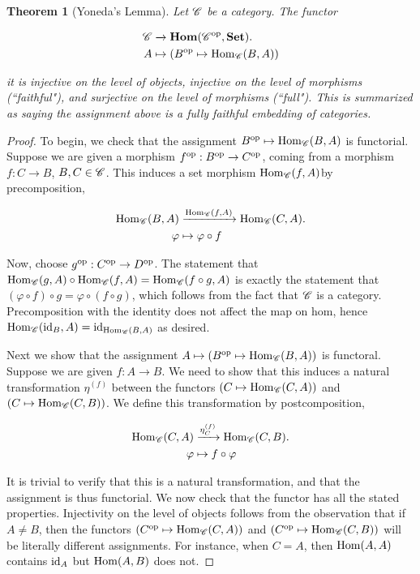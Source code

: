 \documentclass{article}
\newtheorem{theorem}{Theorem}[section]
\theoremstyle{definition}
\numberwithin{figure}{section}
\begin{document}
\begin{theorem}[Yoneda's Lemma] Let $\mathscr{C}$ be a category. The functor

\begin{align*}
\mathscr{C} &\xrightarrow{} \bold{Hom}(\mathscr{C}^{\mathrm{op}},\bold{Set}).\\
A & \mapsto (B^{\mathrm{op}} \mapsto \mathrm{Hom}_{\mathscr{C}}(B,A))
\end{align*}

it is injective on the level of objects, injective on the level of morphisms (``faithful"), and surjective on the level of morphisms (``full"). This is summarized as saying the assignment above is a fully faithful embedding of categories.
\end{theorem}
\begin{proof} To begin, we check that the assignment $B^{\mathrm{op}}\mapsto \mathrm{Hom}_{\mathscr{C}}(B,A)$ is functorial. Suppose we are given a morphism $f^{\mathrm{op}}:B^{\mathrm{op}}\to C^{\mathrm{op}}$, coming from a morphism $f:C\to B$, $B,C\in \mathscr{C}$. This induces a set morphism $\mathrm{Hom}_{\mathscr{C}}(f,A)$by precomposition,

\begin{align*}
\mathrm{Hom}_{\mathscr{C}}(B,A)&\xrightarrow{\mathrm{Hom}_{\mathscr{C}}(f,A)} \mathrm{Hom}_{\mathscr{C}}(C,A).\\
\varphi &\mapsto \varphi \circ f
\end{align*}

Now, choose $g^{\mathrm{op}}:C^{\mathrm{op}}\to D^{\mathrm{op}}$. The statement that $\mathrm{Hom}_{\mathscr{C}}(g,A)\circ \mathrm{Hom}_{\mathscr{C}}(f,A)=\mathrm{Hom}_{\mathscr{C}}(f\circ g, A)$ is exactly the statement that $(\varphi \circ f)\circ g =\varphi \circ (f\circ g)$, which follows from the fact that $\mathscr{C}$ is a category. Precomposition with the identity does not affect the map on hom, hence $\mathrm{Hom}_{\mathscr{C}}(\mathrm{id}_{B},A)=\mathrm{id}_{\mathrm{Hom}_{\mathscr{C}}(B,A)}$ as desired.

Next we show that the assignment $A\mapsto (B^{\mathrm{op}}\mapsto \mathrm{Hom}_{\mathscr{C}}(B,A))$ is functoral. Suppose we are given $f:A\to B$. We need to show that this induces a natural transformation $\eta^{(f)}$ between the functors $\left(C\mapsto \mathrm{Hom}_{\mathscr{C}}(C,A)\right)$ and $\left(C\mapsto \mathrm{Hom}_{\mathscr{C}}(C,B)\right)$. We define this transformation by postcomposition,

\begin{align*}
\mathrm{Hom}_{\mathscr{C}}(C,A)&\xrightarrow{\eta^{(f)}_C}\mathrm{Hom}_{\mathscr{C}}(C,B).\\
\varphi& \mapsto f\circ \varphi
\end{align*}

It is trivial to verify that this is a natural transformation, and that the assignment is thus functorial. We now check that the functor has all the stated properties. Injectivity on the level of objects follows from the observation that if $A\neq B$, then the functors $(C^{\mathrm{op}}\mapsto \mathrm{Hom}_{\mathscr{C}}(C,A))$ and $(C^{\mathrm{op}}\mapsto \mathrm{Hom}_{\mathscr{C}}(C,B))$ will be literally different assignments. For instance, when $C=A$, then $\mathrm{Hom}(A,A)$ contains $\mathrm{id}_A$ but $\mathrm{Hom}(A,B)$ does not.


\end{proof}
\end{document}
